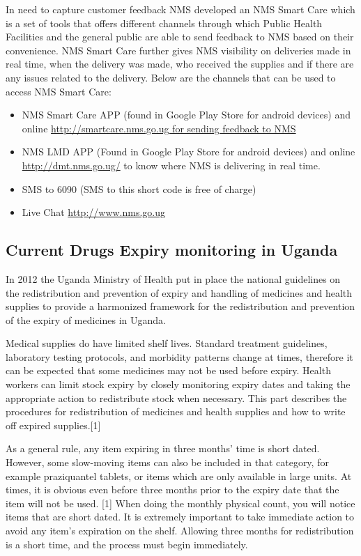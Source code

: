 \documentclass[12pt, a4paper]{report}
\begin{document}
In need to capture customer feedback NMS developed an NMS Smart Care which is a set of tools that offers different channels through which Public Health Facilities and the general public are able to send feedback to NMS based on their convenience. NMS Smart Care further gives NMS visibility on deliveries made in real time, when the delivery was made, who received the supplies and if there are any issues related to the delivery. Below are the channels that can be used to access NMS Smart Care:

\begin{itemize}

\item NMS Smart Care APP (found in Google Play Store for android devices) and online 
\url{http://smartcare.nms.go.ug for sending feedback to NMS}

\item NMS LMD APP (Found in Google Play Store for android devices) and online \url{http://dmt.nms.go.ug/} to know where NMS is delivering in real time.  

\item SMS to 6090 (SMS to this short code is free of charge) 

\item Live Chat  \url{http://www.nms.go.ug}  
\end{itemize}

\subsection{Current Drugs Expiry monitoring in Uganda}
In 2012 the Uganda Ministry of Health put in place the national guidelines on the redistribution and prevention of expiry and handling of medicines and health supplies to provide a harmonized framework for the redistribution and prevention of the expiry of medicines in Uganda. 

Medical supplies do have limited shelf lives. Standard treatment guidelines, laboratory testing protocols, and morbidity patterns change at times, therefore it can be expected that some medicines may not be used before expiry. Health workers can limit stock expiry by closely monitoring expiry dates and taking the appropriate action to redistribute stock when necessary. This part describes the procedures for redistribution of medicines and health supplies and how to write off expired supplies.[1] 

As a general rule, any item expiring in three months’ time is short dated. However, some slow-moving items can also be included in that category, for example praziquantel tablets, or items which are only available in large units. At times, it is obvious even before three months prior to the expiry date that the item will not be used. [1] When doing the monthly physical count, you will notice items that are short dated. It is extremely important to take immediate action to avoid any item’s expiration on the shelf. Allowing three months for redistribution is a short time, and the process must begin immediately.  
\end{document}
